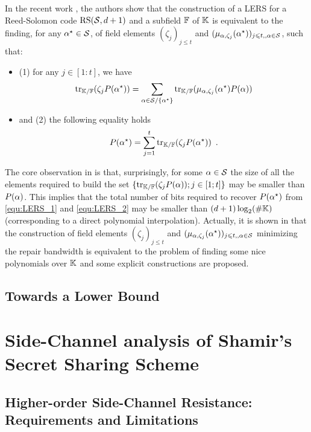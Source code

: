 \documentclass{llncs}
\begin{document}
In the recent work \cite{GW16}, the authors show that the construction of a LERS for a Reed-Solomon code $\RS[\pubSet, \order + 1]$ and a subfield $\FField$ of $\Field$
is equivalent to the finding, for any $\pubEltStar\in \pubSet$, of field elements $(\zeta_j)_{j\leqslant t}$ and $(\mu_{\pubEltNoIndex,\zeta_j}(\pubEltStar))_{j\leqslant t,,\pubEltNoIndex \in \pubSet}$, such that:
\begin{itemize}
\item (1) for any $j\in [1:t]$, we have 
\begin{equation}\label{equ:LERS_1}
\myTrace(\zeta_j P(\pubEltStar)) = \sum_{\pubEltNoIndex \in \pubSet \slash \{\pubEltStar\}} \myTrace(\mu_{\pubEltNoIndex,\zeta_j}(\pubEltStar)P(\pubEltNoIndex))
\end{equation}
\item and (2) the following equality holds
\begin{equation}\label{equ:LERS_2}
P(\pubEltStar) = \sum_{j=1}^t \myTrace(\zeta_j P(\pubEltStar)) \enspace .
\end{equation}
\end{itemize}
The core observation in \cite{GW16} is that, surprisingly, for some $\pubEltNoIndex\in \pubSet$ the size of all the elements required to build the set $\{\myTrace(\zeta_j P(\pubEltNoIndex));j\in [1;t]\}$ may be smaller than $P(\pubEltNoIndex)$. This implies that the total number of bits required to recover $P(\pubEltStar)$ from \eqref{equ:LERS_1} and \eqref{equ:LERS_2} may be smaller than $(\order +1)\log_2(\# \Field)$ (corresponding to a direct polynomial interpolation). Actually, it is shown in \cite{GW16} that the construction of field elements $(\zeta_j)_{j\leqslant t}$ and $(\mu_{\pubEltNoIndex,\zeta_j}(\pubEltStar))_{j\leqslant t,,\pubEltNoIndex \in \pubSet}$ minimizing the repair bandwidth is equivalent to the problem of finding some nice polynomials over $\Field$ and some explicit constructions are proposed.


\subsection{Towards a Lower Bound}
 \todo{}

\section{Side-Channel analysis of Shamir's Secret Sharing Scheme}
\subsection{Higher-order Side-Channel Resistance: Requirements and Limitations}
\end{document}
